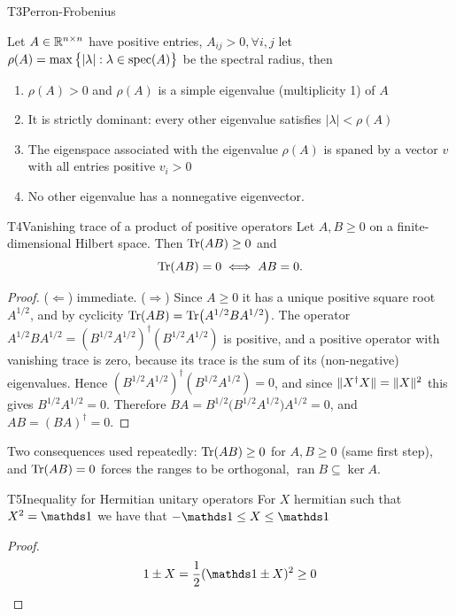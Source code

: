 \documentclass[11pt,a4paper,oneside,open=any,numbers=noenddot]{scrbook}
\begin{document}
\begin{tool}{T3}{Perron-Frobenius}
    \begin{theorem}
        Let $A \in \mathbb{R}^{n\times n}$ have positive entries, $A_{ij}>0, \forall i,j$ let $\rho(A)=\max \big\{|\lambda|: \lambda \in \operatorname{spec}(A)\big\}$ be the spectral radius, then
        \begin{enumerate}
            \item  $\rho(A)>0$ and $\rho(A)$ is a simple eigenvalue (multiplicity 1) of $A$
            \item  It is strictly dominant: every other eigenvalue satisfies $|\lambda|<\rho(A)$ 
            \item The eigenspace associated with the eigenvalue $\rho(A)$ is spaned by a vector $v$ with all entries positive $v_i>0$
            \item No other eigenvalue has a nonnegative eigenvector.
        \end{enumerate}
    \end{theorem}
\end{tool}

\begin{tool}{T4}{Vanishing trace of a product of positive operators}
Let $A,B\ge 0$ on a finite-dimensional Hilbert space. Then $\operatorname{Tr}(AB) \geq 0$ and
\[
  \operatorname{Tr}(AB)=0 \iff AB=0 .
\]
\end{tool}

\begin{proof}
($\Leftarrow$) immediate. ($\Rightarrow$) Since $A\ge0$ it has a unique positive square
root $A^{1/2}$, and by cyclicity $\operatorname{Tr}(AB)=\operatorname{Tr}\bigl(A^{1/2}BA^{1/2}\bigr)$. The operator
$A^{1/2}BA^{1/2}=(B^{1/2}A^{1/2})^{\dagger}(B^{1/2}A^{1/2})$ is positive, and a positive
operator with vanishing trace is zero, because its trace is the sum of its
(non-negative) eigenvalues. Hence $(B^{1/2}A^{1/2})^{\dagger}(B^{1/2}A^{1/2})=0$, and
since $\lVert X^{\dagger}X\rVert=\lVert X\rVert^{2}$ this gives $B^{1/2}A^{1/2}=0$. Therefore
$BA=B^{1/2}\bigl(B^{1/2}A^{1/2}\bigr)A^{1/2}=0$, and $AB=(BA)^{\dagger}=0$.
\end{proof}

\begin{remark}
Two consequences used repeatedly: $\operatorname{Tr}(AB)\ge0$ for $A,B\ge0$ (same first step), and
$\operatorname{Tr}(AB)=0$ forces the ranges to be orthogonal, $\operatorname{ran}B\subseteq\ker A$.
\end{remark}

\begin{tool}{T5}{Inequality for Hermitian unitary operators}
    For $X$ hermitian such that $X^2=\id$ we have that $-\id\leq X \leq \id $

    \begin{proof}
        \begin{equation*}
            1 \pm X =\frac{1}{2}(\id \pm X)^2 \geq0 
        \end{equation*}
    \end{proof}
\end{tool}
\end{document}
